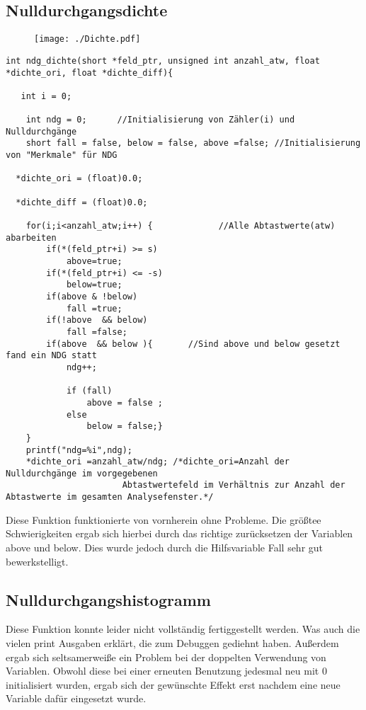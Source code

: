 \documentclass[a4paper,12pt]{article}
\begin{document}
\subsection{Nulldurchgangsdichte}
\begin{figure}[!htp]
\centering
\texttt{[image: ./Dichte.pdf]}
\end{figure}
\begin{lstlisting}[caption={dichte.c}]
int ndg_dichte(short *feld_ptr, unsigned int anzahl_atw, float *dichte_ori, float *dichte_diff){

   int i = 0;

	int ndg = 0;      //Initialisierung von Zähler(i) und Nulldurchgänge
	short fall = false, below = false, above =false; //Initialisierung von "Merkmale" für NDG

  *dichte_ori = (float)0.0;

  *dichte_diff = (float)0.0;

	for(i;i<anzahl_atw;i++) {             //Alle Abtastwerte(atw) abarbeiten
		if(*(feld_ptr+i) >= s)
			above=true;
		if(*(feld_ptr+i) <= -s)
			below=true;
		if(above & !below) 
			fall =true;            
		if(!above  && below)
			fall =false;
		if(above  && below ){       //Sind above und below gesetzt fand ein NDG statt
			ndg++;

			if (fall)
				above = false ;
			else
				below = false;}
	}
	printf("ndg=%i",ndg);
	*dichte_ori =anzahl_atw/ndg; /*dichte_ori=Anzahl der Nulldurchgänge im vorgegebenen
				       Abtastwertefeld im Verhältnis zur Anzahl der Abtastwerte im gesamten Analysefenster.*/

\end{lstlisting}

Diese Funktion funktionierte von vornherein ohne Probleme. Die größtee Schwierigkeiten ergab sich hierbei durch das richtige zurücksetzen der Variablen above und below.
Dies wurde jedoch durch die Hilfsvariable Fall sehr gut bewerkstelligt.

\subsection{Nulldurchgangshistogramm}
Diese Funktion konnte leider nicht vollständig fertiggestellt werden. Was auch die vielen print Ausgaben erklärt, die zum Debuggen gediehnt haben.
Außerdem ergab sich seltsamerweiße ein Problem bei der doppelten Verwendung von Variablen. Obwohl diese bei einer erneuten Benutzung jedesmal neu mit 0 initialisiert wurden, ergab sich der 
gewünschte Effekt erst nachdem eine neue Variable dafür eingesetzt wurde.
\end{document}
